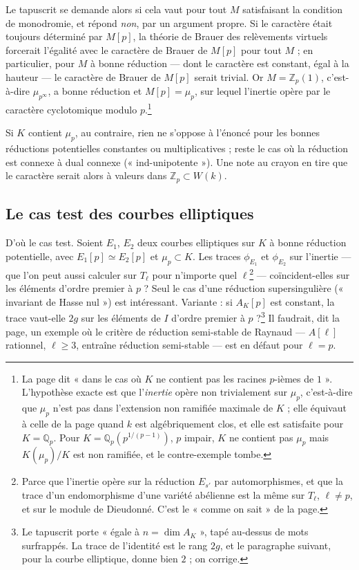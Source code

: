 \documentclass[11pt,a4paper]{article}
\begin{document}
Le tapuscrit se demande alors si cela vaut pour tout $M$ satisfaisant la
condition de monodromie, et répond \emph{non}, par un argument propre. Si le
caractère était toujours déterminé par $M[p]$, la théorie de Brauer des
relèvements virtuels forcerait l'égalité avec le caractère de Brauer de $M[p]$
pour tout $M$ ; en particulier, pour $M$ à bonne réduction --- dont le
caractère est constant, égal à la hauteur --- le caractère de Brauer de $M[p]$
serait trivial. Or $M = \mathbb{Z}_p(1)$, c'est-à-dire $\mu_{p^\infty}$, a bonne
réduction et $M[p] = \mu_p$, sur lequel l'inertie opère par le caractère
cyclotomique modulo $p$.\footnote{La page dit « dans le cas où $K$ ne contient
pas les racines $p$-ièmes de $1$ ». L'hypothèse exacte est que l'\emph{inertie}
opère non trivialement sur $\mu_p$, c'est-à-dire que $\mu_p$ n'est pas dans
l'extension non ramifiée maximale de $K$ ; elle équivaut à celle de la page
quand $k$ est algébriquement clos, et elle est satisfaite pour $K =
\mathbb{Q}_p$. Pour $K = \mathbb{Q}_p(p^{1/(p-1)})$, $p$ impair, $K$ ne contient
pas $\mu_p$ mais $K(\mu_p)/K$ est non ramifiée, et le contre-exemple tombe.}

Si $K$ contient $\mu_p$, au contraire, rien ne s'oppose à l'énoncé pour les
bonnes réductions potentielles constantes ou multiplicatives ; reste le cas
où la réduction est connexe à dual connexe (« ind-unipotente »). Une note au
crayon en tire que le caractère serait alors à valeurs dans $\mathbb{Z}_p
\subset W(k)$.

\subsection*{Le cas test des courbes elliptiques}

D'où le cas test. Soient $E_1$, $E_2$ deux courbes elliptiques sur $K$ à bonne
réduction potentielle, avec $E_1[p] \simeq E_2[p]$ et $\mu_p \subset K$. Les
traces $\phi_{E_1}$ et $\phi_{E_2}$ sur l'inertie --- que l'on peut aussi
calculer sur $T_\ell$ pour n'importe quel $\ell$\footnote{Parce que l'inertie
opère sur la réduction $E_{s'}$ par automorphismes, et que la trace d'un
endomorphisme d'une variété abélienne est la même sur $T_\ell$, $\ell \neq p$,
et sur le module de Dieudonné. C'est le « comme on sait » de la page.} ---
coïncident-elles sur les éléments d'ordre premier à $p$ ? Seul le cas d'une
réduction supersingulière (« invariant de Hasse nul ») est intéressant.
Variante : si $A_K[p]$ est constant, la trace vaut-elle $2g$ sur les éléments
de $I$ d'ordre premier à $p$ ?\footnote{Le tapuscrit porte « égale à $n = \dim
A_K$ », tapé au-dessus de mots surfrappés. La trace de l'identité est le rang
$2g$, et le paragraphe suivant, pour la courbe elliptique, donne bien $2$ ; on
corrige.} Il faudrait, dit la page, un exemple où le critère de réduction
semi-stable de Raynaud --- $A[\ell]$ rationnel, $\ell \geq 3$, entraîne
réduction semi-stable --- est en défaut pour $\ell = p$.
\end{document}
